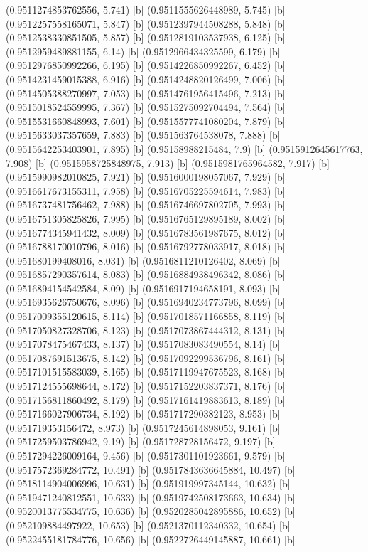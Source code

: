 {{{(0.9511274853762556, 5.741) [b] 
(0.9511555626448989, 5.745) [b] 
(0.9512257558165071, 5.847) [b] 
(0.9512397944508288, 5.848) [b] 
(0.9512538330851505, 5.857) [b] 
(0.9512819103537938, 6.125) [b] 
(0.9512959489881155, 6.14) [b] 
(0.9512966434325599, 6.179) [b] 
(0.9512976850992266, 6.195) [b] 
(0.9514226850992267, 6.452) [b] 
(0.9514231459015388, 6.916) [b] 
(0.9514248820126499, 7.006) [b] 
(0.9514505388270997, 7.053) [b] 
(0.9514761956415496, 7.213) [b] 
(0.9515018524559995, 7.367) [b] 
(0.9515275092704494, 7.564) [b] 
(0.9515531660848993, 7.601) [b] 
(0.9515577741080204, 7.879) [b] 
(0.9515633037357659, 7.883) [b] 
(0.951563764538078, 7.888) [b] 
(0.9515642253403901, 7.895) [b] 
(0.95158988215484, 7.9) [b] 
(0.9515912645617763, 7.908) [b] 
(0.9515958725848975, 7.913) [b] 
(0.9515981765964582, 7.917) [b] 
(0.9515990982010825, 7.921) [b] 
(0.9516000198057067, 7.929) [b] 
(0.9516617673155311, 7.958) [b] 
(0.9516705225594614, 7.983) [b] 
(0.9516737481756462, 7.988) [b] 
(0.9516746697802705, 7.993) [b] 
(0.9516751305825826, 7.995) [b] 
(0.9516765129895189, 8.002) [b] 
(0.9516774345941432, 8.009) [b] 
(0.9516783561987675, 8.012) [b] 
(0.9516788170010796, 8.016) [b] 
(0.9516792778033917, 8.018) [b] 
(0.951680199408016, 8.031) [b] 
(0.9516811210126402, 8.069) [b] 
(0.9516857290357614, 8.083) [b] 
(0.9516884938496342, 8.086) [b] 
(0.9516894154542584, 8.09) [b] 
(0.9516917194658191, 8.093) [b] 
(0.9516935626750676, 8.096) [b] 
(0.9516940234773796, 8.099) [b] 
(0.9517009355120615, 8.114) [b] 
(0.9517018571166858, 8.119) [b] 
(0.9517050827328706, 8.123) [b] 
(0.9517073867444312, 8.131) [b] 
(0.9517078475467433, 8.137) [b] 
(0.9517083083490554, 8.14) [b] 
(0.9517087691513675, 8.142) [b] 
(0.9517092299536796, 8.161) [b] 
(0.9517101515583039, 8.165) [b] 
(0.9517119947675523, 8.168) [b] 
(0.9517124555698644, 8.172) [b] 
(0.9517152203837371, 8.176) [b] 
(0.9517156811860492, 8.179) [b] 
(0.9517161419883613, 8.189) [b] 
(0.9517166027906734, 8.192) [b] 
(0.951717290382123, 8.953) [b] 
(0.951719353156472, 8.973) [b] 
(0.9517245614898053, 9.161) [b] 
(0.9517259503786942, 9.19) [b] 
(0.951728728156472, 9.197) [b] 
(0.9517294226009164, 9.456) [b] 
(0.9517301101923661, 9.579) [b] 
(0.9517572369284772, 10.491) [b] 
(0.9517843636645884, 10.497) [b] 
(0.9518114904006996, 10.631) [b] 
(0.951919997345144, 10.632) [b] 
(0.9519471240812551, 10.633) [b] 
(0.9519742508173663, 10.634) [b] 
(0.9520013775534775, 10.636) [b] 
(0.9520285042895886, 10.652) [b] 
(0.952109884497922, 10.653) [b] 
(0.9521370112340332, 10.654) [b] 
(0.9522455181784776, 10.656) [b] 
(0.9522726449145887, 10.661) [b] 
}}}
